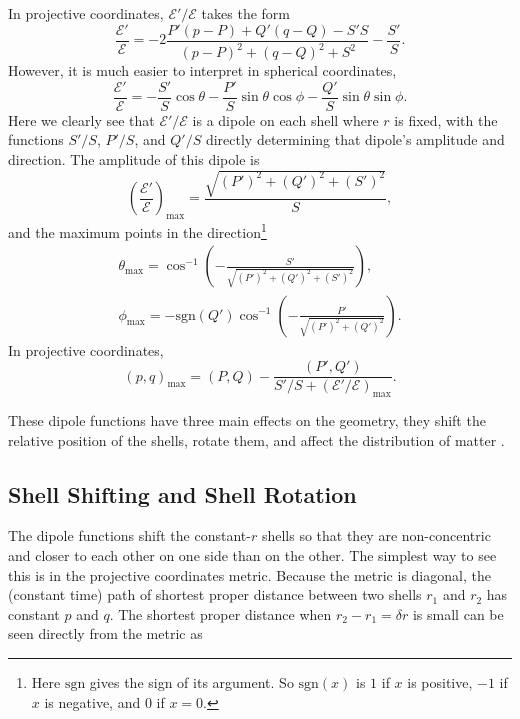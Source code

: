 \documentclass[a4paper,12pt]{report}
\begin{document}
In projective coordinates, $\mathcal{E}'/\mathcal{E}$ takes the form
\begin{equation}\label{eqn: szekeres - E'/E projective}
  \frac{\mathcal{E}'}{\mathcal{E}} = -2\frac{P'(p-P) + Q'(q-Q) - S'S}{(p-P)^2 + (q-Q)^2 + S^2} - \frac{S'}{S}.
\end{equation}
However, it is much easier to interpret in spherical coordinates,
\begin{equation}\label{eqn: szekeres - E'/E spherical}
  \frac{\mathcal{E}'}{\mathcal{E}} = -\frac{S'}{S}\cos\theta - \frac{P'}{S}\sin\theta\cos\phi - \frac{Q'}{S}\sin\theta\sin\phi.
\end{equation}
Here we clearly see that $\mathcal{E}'/\mathcal{E}$ is a dipole on each shell where $r$ is fixed, with the functions ${S'/S}$, ${P'/S}$, and ${Q'/S}$ directly determining that dipole's amplitude and direction. The amplitude of this dipole is
\begin{equation}\label{eqn: szekeres - E'/E amplitude}
  \left(\frac{\mathcal{E}'}{\mathcal{E}}\right)_{\text{max}} = \frac{\sqrt{(P')^2 + (Q')^2 + (S')^2}}{S},
\end{equation}
and the maximum points in the direction\footnote{Here $\text{sgn}$ gives the sign of its argument. So $\text{sgn}(x)$ is $1$ if $x$ is positive, $-1$ if $x$ is negative, and $0$ if $x=0$.}
\begin{subequations}
  \begin{align}\label{eqn: szekeres - E'/E direction spherical}
    \theta_{\text{max}} = \cos^{-1}\left(-\frac{S'}{\sqrt{(P')^2 + (Q')^2 + (S')^2}}\right), \\
    \phi_\text{max} = -\text{sgn}(Q')\cos^{-1}\left(-\frac{P'}{\sqrt{(P')^2 + (Q')^2}}\right).
  \end{align}
\end{subequations}
In projective coordinates,
\begin{equation}\label{eqn: szekeres - E'/E direction projective}
  (p,q)_\text{max} = (P,Q) - \frac{(P',Q')}{S'/S + (\mathcal{E}'/\mathcal{E})_\text{max}}.
\end{equation}

These dipole functions have three main effects on the geometry, they shift the relative position of the shells, rotate them, and affect the distribution of matter \cite{RN12,RN11,RN1,RN2}.

\subsection{Shell Shifting and Shell Rotation}
The dipole functions shift the constant-$r$ shells so that they are non-concentric and closer to each other on one side than on the other. The simplest way to see this is in the projective coordinates metric. Because the metric is diagonal, the (constant time) path of shortest proper distance between two shells $r_1$ and $r_2$ has constant $p$ and $q$. The shortest proper distance when $r_2 - r_1 = \delta r$ is small can be seen directly from the metric as
\end{document}
